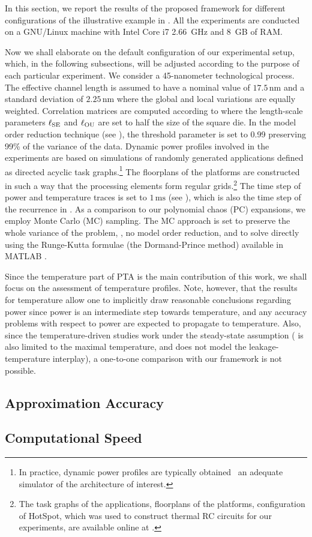 
In this section, we report the results of the proposed framework for different configurations of the illustrative example in .
All the experiments are conducted on a GNU/Linux machine with Intel Core i7 2.66~GHz and 8~GB of RAM.

Now we shall elaborate on the default configuration of our experimental setup, which, in the following subsections, will be adjusted according to the purpose of each particular experiment.
We consider a 45-nanometer technological process.
The effective channel length is assumed to have a nominal value of $17.5\,\text{nm}$ \cite{ptm} and a standard deviation of $2.25\,\text{nm}$ where the global and local variations are equally weighted.
Correlation matrices are computed according to  where the length-scale parameters $\ell_{\text{SE}}$ and $\ell_{\text{OU}}$ are set to half the size of the square die.
In the model order reduction technique (see ), the threshold parameter is set to 0.99 preserving 99\% of the variance of the data.
Dynamic power profiles involved in the experiments are based on simulations of randomly generated applications defined as directed acyclic task graphs.\footnote{In practice, dynamic power profiles are typically obtained \via\ an adequate simulator of the architecture of interest.}
The floorplans of the platforms are constructed in such a way that the processing elements form regular grids.\footnote{The task graphs of the applications, floorplans of the platforms, configuration of HotSpot, which was used to construct thermal RC circuits for our experiments, are available online at \cite{sources}.}
The time step of power and temperature traces is set to $1\,\text{ms}$ (see ), which is also the time step of the recurrence in .
As a comparison to our polynomial chaos (PC) expansions, we employ Monte Carlo (MC) sampling.
The MC approach is set to preserve the whole variance of the problem, \ie, no model order reduction, and to solve  directly using the Runge-Kutta formulae (the Dormand-Prince method) available in MATLAB \cite{matlab}.

Since the temperature part of PTA is the main contribution of this work, we shall focus on the assessment of temperature profiles.
Note, however, that the results for temperature allow one to implicitly draw reasonable conclusions regarding power since power is an intermediate step towards temperature, and any accuracy problems with respect to power are expected to propagate to temperature.
Also, since the temperature-driven studies \cite{juan2011, juan2012, huang2009, lee2013} work under the steady-state assumption (\cite{juan2011} is also limited to the maximal temperature, and \cite{huang2009} does not model the leakage-temperature interplay), a one-to-one comparison with our framework is not possible.

\subsection{Approximation Accuracy} 


\subsection{Computational Speed} 

